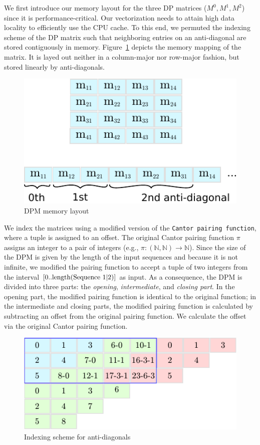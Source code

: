 \documentclass[runningheads,a4paper]{llncs}
\begin{document}
We first introduce our memory layout for the three DP matrices ($M^0, M^1, M^2$) since it is performance-critical.
Our vectorization needs to attain high data locality to efficiently use the CPU cache.
To this end,  we permuted the indexing scheme of the DP matrix such that neighboring entries on an anti-diagonal are stored contiguously in memory. 
Figure~\ref{fig:indexing} depicts the memory mapping of the matrix. 
It is layed out neither in a column-major nor row-major fashion, but stored linearly by anti-diagonals. 

\begin{figure}[ht!]
  \centering
  \includegraphics[scale=0.9]{figures/indexing.pdf}
  \caption{DPM memory layout}
  \label{fig:indexing}
\end{figure}

We index the matrices using a modified version of the \texttt{Cantor pairing function}, where a tuple is assigned to an offset. 
The original Cantor pairing function $\pi$ assigns an integer to a pair of integers (e.g., $\pi: (\mathbb{N}, \mathbb{N}) \rightarrow \mathbb{N}$). 
Since the size of the DPM is given by the length of the input sequences and because it is not infinite, 
we modified the pairing function to accept a tuple of two integers from the interval $[0..\textrm{length}(\textrm{Sequence 1\textbar2})]$ as input. 
As a consequence, the DPM is divided into three parts: the \emph{opening}, \emph{intermediate}, and \emph{closing part}. 
In the opening part, the modified pairing function is identical to the original function; in the intermediate and closing parts, 
the modified pairing function is calculated by subtracting an offset from the original pairing function. 
We calculate the offset via the original Cantor pairing function.

\begin{figure}[ht!]
  \centering
  \includegraphics[scale=0.9]{figures/pairingfunc.pdf}
  \caption{Indexing scheme for anti-diagonals}
  \label{fig:pairingfunc}
\end{figure}
\end{document}
